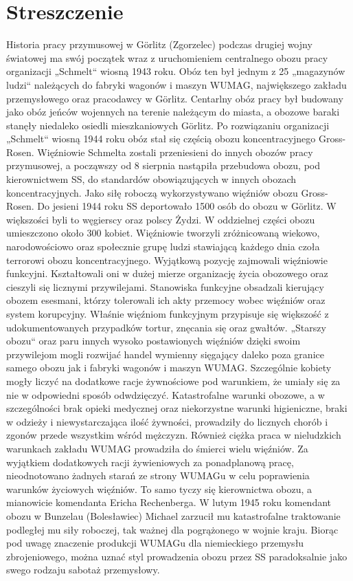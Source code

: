 \documentclass[a4paper,12pt,ngerman,
]{nisebook}
\begin{document}
\section{Streszczenie}
Historia pracy przymusowej w Görlitz (Zgorzelec) podczas drugiej wojny światowej ma swój początek wraz z uruchomieniem centralnego obozu pracy organizacji „Schmelt“ wiosną 1943 roku. Obóz ten był jednym z 25 „magazynów ludzi“ należących do  fabryki wagonów i maszyn WUMAG, największego zakładu przemysłowego oraz pracodawcy w Görlitz. Centarlny obóz pracy był budowany jako obóz jeńców wojennych na terenie należącym do miasta, a obozowe baraki stanęły niedaleko osiedli mieszkaniowych Görlitz. Po rozwiązaniu organizacji „Schmelt“ wiosną 1944 roku obóz stał się częścią obozu koncentracyjnego Gross-Rosen. Więźniowie Schmelta zostali przeniesieni do innych obozów pracy przymusowej, a począwszy od 8 sierpnia nastąpiła przebudowa obozu, pod kierownictwem SS,  do standardów obowiązujących w innych obozach koncentracyjnych. Jako siłę roboczą wykorzystywano więźniów obozu Gross-Rosen. Do jesieni 1944 roku SS deportowało 1500 osób do obozu w Görlitz. W większości byli to węgierscy oraz polscy Żydzi. W oddzielnej części obozu umieszczono około 300 kobiet.
Więźniowie tworzyli zróżnicowaną wiekowo, narodowościowo oraz społecznie grupę ludzi stawiającą każdego dnia czoła terrorowi obozu koncentracyjnego. Wyjątkową pozycję zajmowali więźniowie funkcyjni. Kształtowali oni w dużej mierze organizację życia obozowego oraz cieszyli się licznymi przywilejami. Stanowiska funkcyjne obsadzali kierujący obozem esesmani, którzy tolerowali ich akty przemocy wobec więźniów oraz  system korupcyjny. Właśnie więźniom funkcyjnym przypisuje się większość z udokumentowanych przypadków tortur, znęcania się oraz gwałtów. „Starszy obozu“ oraz paru innych wysoko postawionych więźniów dzięki swoim przywilejom mogli rozwijać handel wymienny sięgający daleko poza granice samego obozu jak i fabryki wagonów i maszyn WUMAG. Szczególnie kobiety mogły liczyć na dodatkowe racje żywnościowe pod warunkiem, że umiały się za nie w odpowiedni sposób odwdzięczyć.
Katastrofalne warunki obozowe, a w szczególności brak opieki medycznej oraz niekorzystne warunki higieniczne, braki w odzieży i niewystarczająca ilość żywności, prowadziły do licznych chorób i zgonów przede wszystkim wśród mężczyzn. Również ciężka praca w nieludzkich warunkach zakładu WUMAG prowadziła do śmierci wielu więźniów. Za wyjątkiem dodatkowych racji żywieniowych za ponadplanową pracę, nieodnotowano żadnych starań ze strony WUMAGu w celu poprawienia warunków życiowych więźniów. To samo tyczy się kierownictwa obozu, a mianowicie komendanta Ericha Rechenberga. W lutym 1945 roku komendant obozu w Bunzelau (Bolesławiec) Michael zarzucił mu katastrofalne traktowanie podległej mu siły roboczej, tak ważnej dla pogrążonego w wojnie kraju. Biorąc pod uwagę znaczenie produkcji WUMAGu dla niemieckiego przemysłu zbrojeniowego, można uznać styl prowadzenia obozu przez SS paradoksalnie jako swego rodzaju sabotaż przemysłowy.
\end{document}
